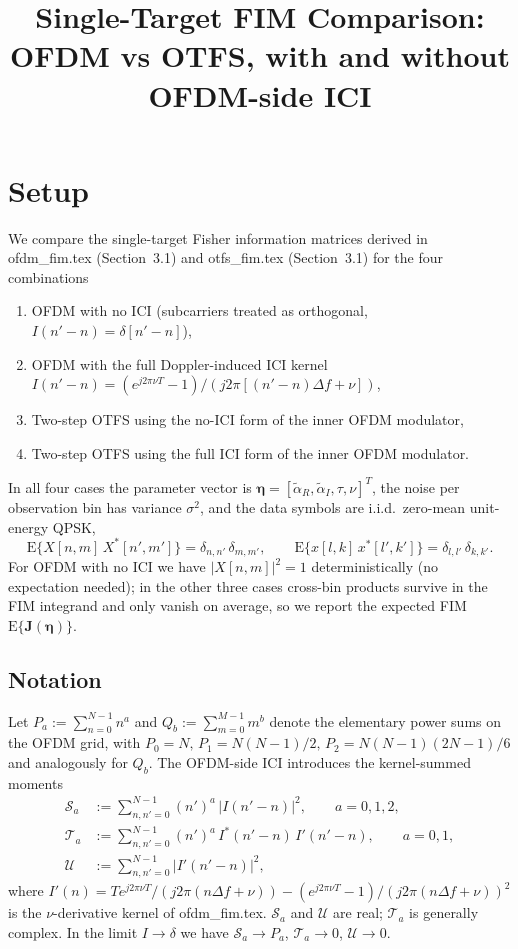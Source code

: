 \documentclass[11pt]{article}
\title{Single-Target FIM Comparison:\\
OFDM vs OTFS, with and without OFDM-side ICI}
\author{}
\date{}
\begin{document}
\maketitle

\section{Setup}

We compare the single-target Fisher information matrices derived in
ofdm\_fim.tex (Section~3.1) and otfs\_fim.tex (Section~3.1) for the
four combinations
\begin{enumerate}
    \item OFDM with no ICI (subcarriers treated as orthogonal,
          \(I(n'-n) = \delta[n'-n]\)),
    \item OFDM with the full Doppler-induced ICI kernel
          \(I(n'-n) = (e^{j2\pi\nu T}-1)/(j2\pi[(n'-n)\Delta f + \nu])\),
    \item Two-step OTFS using the no-ICI form of the inner OFDM
          modulator,
    \item Two-step OTFS using the full ICI form of the inner OFDM
          modulator.
\end{enumerate}
In all four cases the parameter vector is
\(\bm{\eta} = [\tilde{\alpha}_R,\tilde{\alpha}_I,\tau,\nu]^T\), the
noise per observation bin has variance \(\sigma^2\), and the data
symbols are i.i.d.\ zero-mean unit-energy QPSK,
\begin{equation}
    \mathrm{E}\{X[n,m]\,X^*[n',m']\} = \delta_{n,n'}\,\delta_{m,m'},
    \qquad
    \mathrm{E}\{x[l,k]\,x^*[l',k']\} = \delta_{l,l'}\,\delta_{k,k'}.
\end{equation}
For OFDM with no ICI we have \(|X[n,m]|^2 = 1\) deterministically (no
expectation needed); in the other three cases cross-bin products
survive in the FIM integrand and only vanish on average, so we report
the expected FIM \(\mathrm{E}\{\bm{J}(\bm{\eta})\}\).

\subsection*{Notation}

Let \(P_a := \sum_{n=0}^{N-1} n^a\) and \(Q_b := \sum_{m=0}^{M-1} m^b\)
denote the elementary power sums on the OFDM grid, with
\(P_0 = N,\, P_1 = N(N-1)/2,\, P_2 = N(N-1)(2N-1)/6\) and analogously
for \(Q_b\). The OFDM-side ICI introduces the kernel-summed moments
\begin{align}
    \mathcal{S}_a &:= \sum_{n,n'=0}^{N-1} (n')^a\, |I(n'-n)|^2,
        \qquad a = 0,1,2, \\
    \mathcal{T}_a &:= \sum_{n,n'=0}^{N-1} (n')^a\, I^*(n'-n)\, I'(n'-n),
        \qquad a = 0,1, \\
    \mathcal{U}   &:= \sum_{n,n'=0}^{N-1} |I'(n'-n)|^2,
\end{align}
where \(I'(n) = T e^{j2\pi\nu T}/(j2\pi(n\Delta f + \nu))
                 - (e^{j2\pi\nu T} - 1)/(j2\pi(n\Delta f + \nu))^2\)
is the \(\nu\)-derivative kernel of ofdm\_fim.tex.
\(\mathcal{S}_a\) and \(\mathcal{U}\) are real; \(\mathcal{T}_a\) is
generally complex. In the limit \(I\to\delta\) we have
\(\mathcal{S}_a\to P_a\), \(\mathcal{T}_a\to 0\), \(\mathcal{U}\to 0\).
\end{document}
